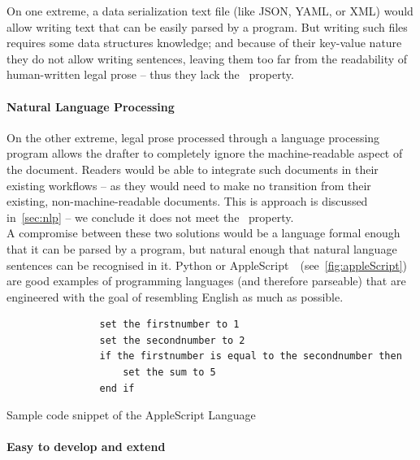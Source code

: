 On one extreme, a data serialization text file (like JSON, YAML, or XML) would allow writing text that can be easily parsed by a program.
But writing such files requires some data structures knowledge;
and because of their key-value nature they do not allow writing sentences, leaving them too far from the readability of human-written legal prose -- thus they lack the~ property.

\paragraph{Natural Language Processing}

On the other extreme, legal prose processed through a language processing program allows the drafter to completely ignore the machine-readable aspect of the document.
Readers would be able to integrate such documents in their existing workflows -- as they would need to make no transition from their existing, non-machine-readable documents.
This is approach is discussed in~\autoref{sec:nlp} -- we conclude it does not meet the~ property.\\

A compromise between these two solutions would be a language formal enough that it can be parsed by a program, but natural enough that natural language sentences can be recognised in it.
Python or AppleScript~\cite{Sanderson2010appleScript}~(see~\autoref{fig:appleScript}) are good examples of programming languages (and therefore parseable) that are engineered with the goal of resembling English as much as possible.

\begin{listing}[h]
    \centering
    \begin{minipage}{0.8\textwidth}
        \begin{verbatim}
                set the firstnumber to 1
                set the secondnumber to 2
                if the firstnumber is equal to the secondnumber then
                    set the sum to 5
                end if
        \end{verbatim}
    \end{minipage}
    \caption{Sample code snippet of the AppleScript Language~\cite{Sanderson2010appleScript}}
    \label{fig:appleScript}
\end{listing}

\paragraph{Easy to develop and extend}

